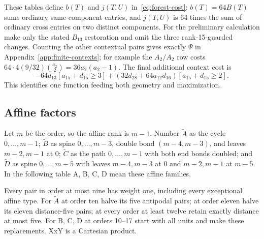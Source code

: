 \documentclass[11pt]{article}
\theoremstyle{remark}\newtheorem{remark}[theorem]{Remark}
\begin{document}
These tables define $b(T)$ and $j(T,U)$ in~\eqref{eq:forest-cost}:
$b(T)=64B(T)$ sums ordinary same-component entries, and $j(T,U)$
is 64 times the sum of ordinary cross entries on two distinct
components. For the preliminary calculation make only the stated
$B_{13}$ restoration and omit the three rank-15-guarded changes.
Counting the other contextual pairs gives exactly $\Psi$ in
Appendix~\ref{app:finite-contexts}; for example the $A_2/A_2$
row costs $64\cdot4(9/32)\binom{a_2}{2}=36a_2(a_2-1)$.
The final additional context cost is
\[
 -64d_{13}[a_{15}+d_{15}\ge3]
 +(32d_{28}+64a_{12}d_{16})[a_{15}+d_{15}\ge2].
\]
This identifies one function feeding both geometry and maximization.

\subsection{Affine factors}
Let $m$ be the order, so the affine rank is $m-1$.
Number $\widetilde A$ as the cycle $0,\ldots,m-1$;
$\widetilde B$ as spine $0,\ldots,m-3$, double bond $(m-4,m-3)$,
and leaves $m-2,m-1$ at 0;
$\widetilde C$ as the path $0,\ldots,m-1$ with both end bonds
doubled; and $\widetilde D$ as spine $0,\ldots,m-5$ with leaves
$m-4,m-3$ at 0 and $m-2,m-1$ at $m-5$.
In the following table A, B, C, D mean these affine families.

Every pair in order at most nine has weight one, including every
exceptional affine type. For $\widetilde A$ at order ten halve
its five antipodal pairs; at order eleven halve its eleven
distance-five pairs; at every order at least twelve retain exactly
distance at most five. For B, C, D at orders 10--17 start with
all units and make these replacements. XxY is a Cartesian product.
\end{document}
